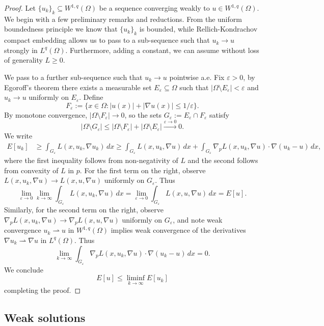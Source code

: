 \documentclass[reqno]{amsart}
\theoremstyle{definition}
\theoremstyle{remark}
\renewcommand{\epsilon}{\varepsilon}
\begin{document}
\begin{proof}
	Let $\{u_k \}_k \subseteq W^{1, q} (\Omega)$ be a sequence converging weakly to $u \in W^{1, q} (\Omega)$. We begin with a few preliminary remarks and reductions.
	From the uniform boundedness principle we know that $\{u_k\}_k$ is bounded, while Rellich-Kondrachov compact embedding allows us to pass to a sub-sequence such that $u_k \to u$ strongly in $L^q (\Omega)$. Furthermore, adding a constant, we can assume without loss of generality $L \geq 0$.
	
	We pass to a further sub-sequence such that $u_k \to u$ pointwise a.e. Fix $\epsilon > 0$, by Egoroff's theorem there exists a measurable set $E_\epsilon \subseteq \Omega$ such that $|\Omega \setminus E_\epsilon| <\epsilon$ and $u_k \to u$ uniformly on $E_\epsilon$. Define
		\[ F_\epsilon := \{ x \in \Omega : |u(x)| + |\nabla u(x)| \leq 1/\epsilon \}. \]
	By monotone convergence, $|\Omega \setminus F_\epsilon| \to 0$, so the sets $G_\epsilon := E_\epsilon \cap F_\epsilon$ satisfy
		\[ |\Omega \setminus G_\epsilon| \leq |\Omega \setminus F_\epsilon| + |\Omega \setminus E_\epsilon| \overset{\epsilon \to 0}{\longrightarrow} 0. \]
	We write
		\begin{align*}
			E[u_k]
				&\geq \int_{G_\epsilon} L(x, u_k, \nabla u_k) \, dx \geq \int_{G_\epsilon} L(x, u_k, \nabla u) \, dx + \int_{G_\epsilon} \nabla_p L (x, u_k, \nabla u) \cdot \nabla (u_k - u) \, dx,
		\end{align*}	
	where the first inequality follows from non-negativity of $L$ and the second follows from convexity of $L$ in $p$. For the first term on the right, observe $L(x, u_k, \nabla u) \to L(x, u, \nabla u)$ uniformly on $G_\epsilon$. Thus
		\[ \lim_{\epsilon \to 0}\lim_{k \to \infty} \int_{G_\epsilon} L(x, u_k, \nabla u) \, dx = \lim_{\epsilon \to 0} \int_{G_\epsilon} L(x, u, \nabla u) \, dx = E[u]. \]
	Similarly, for the second term on the right, observe $\nabla_p L(x, u_k, \nabla u) \to \nabla_p L(x, u, \nabla u)$ uniformly on $G_\epsilon$, and note weak convergence $u_k \rightharpoonup u$ in $W^{1, q} (\Omega)$ implies weak convergence of the derivatives $\nabla u_k \rightharpoonup \nabla u$ in $L^{q} (\Omega)$. Thus
		\[ \lim_{k \to \infty}  \int_{G_\epsilon} \nabla_p L (x, u_k, \nabla u) \cdot \nabla (u_k - u) \, dx = 0. \]
	We conclude
		\[ E[u] \leq \liminf_{k \to \infty} E[u_k] \]	
	completing the proof. 
\end{proof}

\subsection{Weak solutions}
\end{document}
